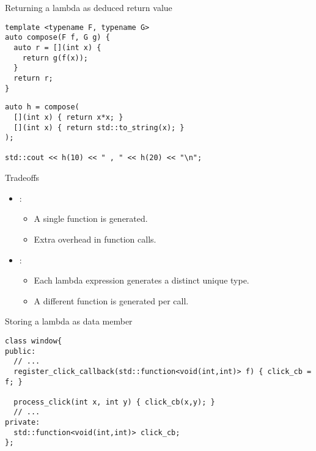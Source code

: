 \begin{frame}[t,fragile]{Returning a lambda as deduced return value}
\begin{lstlisting}
template <typename F, typename G>
auto compose(F f, G g) {
  auto r = [](int x) {
    return g(f(x));
  }
  return r;
}
\end{lstlisting}

\begin{lstlisting}
auto h = compose(
  [](int x) { return x*x; }
  [](int x) { return std::to_string(x); }
);

std::cout << h(10) << " , " << h(20) << "\n";
\end{lstlisting}
\end{frame}

\begin{frame}[t,fragile]{Tradeoffs}
\begin{itemize}
  \item {}:
    \begin{itemize}
      \item A single function is generated.
      \item Extra overhead in function calls.
    \end{itemize}

  \item {}:
    \begin{itemize}
      \item Each lambda expression generates a distinct unique type.
      \item A different function is generated per call.
    \end{itemize}
\end{itemize}
\end{frame}

\begin{frame}[t,fragile]{Storing a lambda as data member}
\begin{lstlisting}
class window{
public:
  // ...
  register_click_callback(std::function<void(int,int)> f) { click_cb = f; }
  
  process_click(int x, int y) { click_cb(x,y); }
  // ...
private:
  std::function<void(int,int)> click_cb;
};
\end{lstlisting}
\end{frame}

